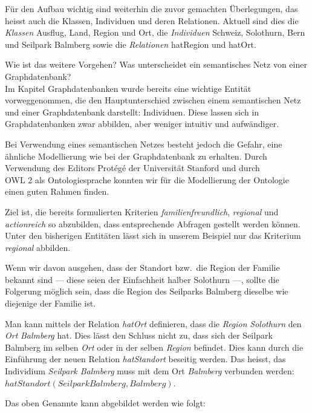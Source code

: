 Für den Aufbau wichtig sind weiterhin die zuvor gemachten Überlegungen, das heisst auch die Klassen, Individuen und deren Relationen. Aktuell sind dies die \textit{Klassen} Ausflug, Land, Region und Ort, die \textit{Individuen} Schweiz, Solothurn, Bern und Seilpark Balmberg sowie die \textit{Relationen} hatRegion und hatOrt.

Wie ist das weitere Vorgehen? Was unterscheidet ein semantisches Netz von einer Graphdatenbank?\\
Im Kapitel Graphdatenbanken wurde bereits eine wichtige Entität vorweggenommen, die den Hauptunterschied zwischen einem semantischen Netz und einer Graphdatenbank darstellt: Individuen. Diese lassen sich in Graphdatenbanken zwar abbilden, aber weniger intuitiv und aufwändiger.

Bei Verwendung eines semantischen Netzes besteht jedoch die Gefahr, eine ähnliche Modellierung wie bei der Graphdatenbank zu erhalten. Durch Verwendung des Editors Protégé der Universität Stanford und durch\\
OWL 2 als Ontologiesprache konnten wir für die Modellierung der Ontologie einen guten Rahmen finden.

Ziel ist, die bereits formulierten Kriterien \textit{familienfreundlich}, \textit{regional} und \textit{actionreich} so abzubilden, dass entsprechende Abfragen gestellt werden können.\\
Unter den bisherigen Entitäten lässt sich in unserem Beispiel nur das Kriterium \textit{regional} abbilden.

Wenn wir davon ausgehen, dass der Standort bzw.\ die Region der Familie bekannt sind --- diese seien der Einfachheit halber Solothurn ---, sollte die Folgerung möglich sein, dass die Region des Seilparks Balmberg dieselbe wie diejenige der Familie ist.

Man kann mittels der Relation \textit{hatOrt} definieren, dass die \textit{Region} \textit{Solothurn} den \textit{Ort} \textit{Balmberg} hat. Dies lässt den Schluss nicht zu, dass sich der Seilpark Balmberg im selben \textit{Ort} oder in der selben \textit{Region} befindet. Dies kann durch die Einführung der neuen Relation \textit{hatStandort} beseitig werden. Das heisst, das Individium \textit{Seilpark Balmberg} muss mit dem Ort \textit{Balmberg} verbunden werden: $ hatStandort(SeilparkBalmberg, Balmberg) $.

\newpage

Das oben Genannte kann abgebildet werden wie folgt:


